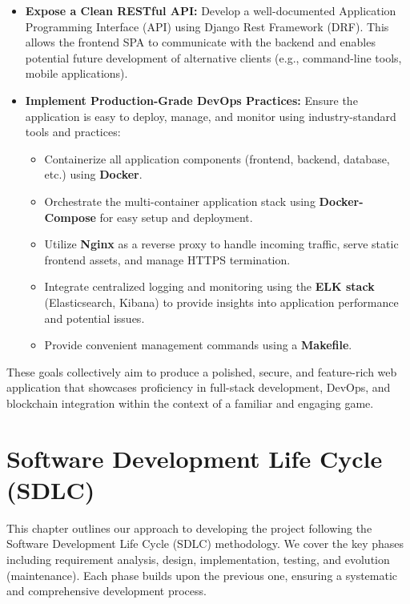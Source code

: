 \begin{itemize}
    \item \textbf{Expose a Clean RESTful API:} Develop a well-documented Application Programming Interface (API) using Django Rest Framework (DRF). This allows the frontend SPA to communicate with the backend and enables potential future development of alternative clients (e.g., command-line tools, mobile applications).
    
    \item \textbf{Implement Production-Grade DevOps Practices:} Ensure the application is easy to deploy, manage, and monitor using industry-standard tools and practices:
    \begin{itemize}
        \item Containerize all application components (frontend, backend, database, etc.) using \textbf{Docker}.
        \item Orchestrate the multi-container application stack using \textbf{Docker-Compose} for easy setup and deployment.
        \item Utilize \textbf{Nginx} as a reverse proxy to handle incoming traffic, serve static frontend assets, and manage HTTPS termination.
        \item Integrate centralized logging and monitoring using the \textbf{ELK stack} (Elasticsearch, Kibana) to provide insights into application performance and potential issues.
        \item Provide convenient management commands using a \textbf{Makefile}.
    \end{itemize}
\end{itemize}

These goals collectively aim to produce a polished, secure, and feature-rich web application that showcases proficiency in full-stack development, DevOps, and blockchain integration within the context of a familiar and engaging game.

\chapter{Software Development Life Cycle (SDLC)}
\label{ch:sdlc}

This chapter outlines our approach to developing the project following the Software Development Life Cycle (SDLC) methodology. We cover the key phases including requirement analysis, design, implementation, testing, and evolution (maintenance). Each phase builds upon the previous one, ensuring a systematic and comprehensive development process.

